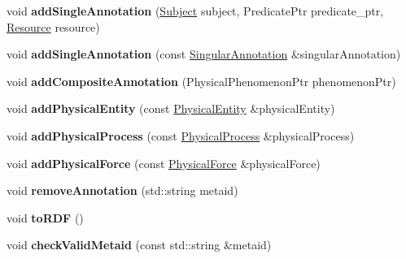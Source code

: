\begin{DoxyCompactItemize}
void {\bfseries add\+Single\+Annotation} (\hyperlink{classsemsim_1_1Subject}{Subject} subject, Predicate\+Ptr predicate\+\_\+ptr, \hyperlink{classsemsim_1_1Resource}{Resource} resource)
\item 
\mbox{\label{classsemsim_1_1Editor_a10a8f7428a17459dbd5bde7def25643d}} 
void {\bfseries add\+Single\+Annotation} (const \hyperlink{classsemsim_1_1Triple}{Singular\+Annotation} \&singular\+Annotation)
\item 
\mbox{\label{classsemsim_1_1Editor_af4d4f32ca8dd1c7a952ec8887dfaf3d1}} 
void {\bfseries add\+Composite\+Annotation} (Physical\+Phenomenon\+Ptr phenomenon\+Ptr)
\item 
\mbox{\label{classsemsim_1_1Editor_a84dd4e8fe151f36ee1123fac64cc2b27}} 
void {\bfseries add\+Physical\+Entity} (const \hyperlink{classsemsim_1_1PhysicalEntity}{Physical\+Entity} \&physical\+Entity)
\item 
\mbox{\label{classsemsim_1_1Editor_adc886e368be6480e45d8cbd56b126927}} 
void {\bfseries add\+Physical\+Process} (const \hyperlink{classsemsim_1_1PhysicalProcess}{Physical\+Process} \&physical\+Process)
\item 
\mbox{\label{classsemsim_1_1Editor_a24b2ab15e71bae083c58ebf73fa9fdd5}} 
void {\bfseries add\+Physical\+Force} (const \hyperlink{classsemsim_1_1PhysicalForce}{Physical\+Force} \&physical\+Force)
\item 
\mbox{\label{classsemsim_1_1Editor_ae4d2ddb5f9c637bdaa9b65008bb00dfb}} 
void {\bfseries remove\+Annotation} (std\+::string metaid)
\item 
\mbox{\label{classsemsim_1_1Editor_a71f30e2cb766b0ad3ee4ed420cae4109}} 
void {\bfseries to\+R\+DF} ()
\item 
\mbox{\label{classsemsim_1_1Editor_a3b02b6bfc728e4c36f74264295fba184}} 
void {\bfseries check\+Valid\+Metaid} (const std\+::string \&metaid)
\item 
\mbox{\label{classsemsim_1_1Editor_a9b7c00e09b8ddc5e2daebf2a2cb9fe91}} 

\end{DoxyCompactItemize}
